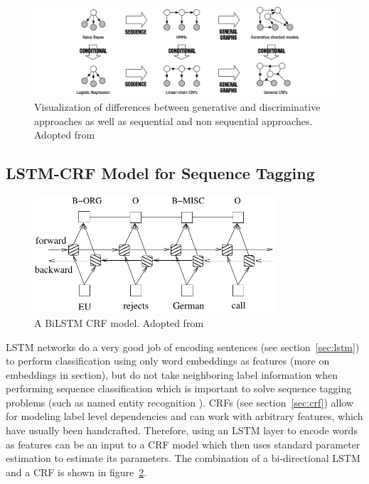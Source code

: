 
\begin{figure}
	\includegraphics[width=\textwidth]{different_markovs.png}
	\caption{Visualization of differences between generative and discriminative approaches
	as well as sequential and non sequential approaches.
	Adopted from \citep{sutton2012introduction}}
	\label{fig:different_graphicals}
\end{figure}



\subsection{LSTM-CRF Model for Sequence Tagging}
\label{subsec:lstm_crf}

\begin{figure}
	\includegraphics[width=0.8\textwidth]{biLstmCRF.pdf}
	\caption{A BiLSTM CRF model. Adopted from 
	\citep{huang2015bidirectional}
	}
	\label{fig:bilstm_crf}
\end{figure}


LSTM networks do a very good job of encoding sentences
(see section~\ref{sec:lstm}) to perform classification using only 
word embeddings as features (more on embeddings in section),
but do not take neighboring label information when performing sequence
classification which is important to solve sequence tagging
problems (such as named entity recognition \citep{nadeau2007survey}).
CRFs (see section~\ref{sec:crf}) allow for modeling label level 
dependencies and can work with arbitrary features, which have usually been
handcrafted.
Therefore, using an LSTM layer to encode words as features can be an input to a
CRF model which then uses standard 
parameter estimation to estimate its parameters. 
The combination of a bi-directional LSTM and a CRF is shown in figure~\ref{fig:bilstm_crf}.

